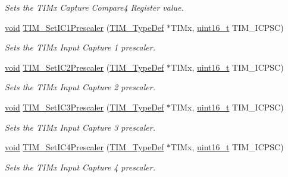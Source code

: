 \begin{DoxyCompactItemize}
\begin{DoxyCompactList}\small\item\em Sets the T\+I\+Mx Capture Compare4 Register value. \end{DoxyCompactList}\item 
\hyperlink{usb__devapi_8h_afabf60e7f57651d6d595a02c75f07cd0}{void} \hyperlink{group___t_i_m___private___functions_gaf0f684dea88e222de9689d8ed0ca8805}{T\+I\+M\+\_\+\+Set\+I\+C1\+Prescaler} (\hyperlink{struct_t_i_m___type_def}{T\+I\+M\+\_\+\+Type\+Def} $\ast$T\+I\+Mx, \hyperlink{_p_e___types_8h_a1f1825b69244eb3ad2c7165ddc99c956}{uint16\+\_\+t} T\+I\+M\+\_\+\+I\+C\+P\+SC)
\begin{DoxyCompactList}\small\item\em Sets the T\+I\+Mx Input Capture 1 prescaler. \end{DoxyCompactList}\item 
\hyperlink{usb__devapi_8h_afabf60e7f57651d6d595a02c75f07cd0}{void} \hyperlink{group___t_i_m___private___functions_ga3cc4869b5fe73271808512c89322a325}{T\+I\+M\+\_\+\+Set\+I\+C2\+Prescaler} (\hyperlink{struct_t_i_m___type_def}{T\+I\+M\+\_\+\+Type\+Def} $\ast$T\+I\+Mx, \hyperlink{_p_e___types_8h_a1f1825b69244eb3ad2c7165ddc99c956}{uint16\+\_\+t} T\+I\+M\+\_\+\+I\+C\+P\+SC)
\begin{DoxyCompactList}\small\item\em Sets the T\+I\+Mx Input Capture 2 prescaler. \end{DoxyCompactList}\item 
\hyperlink{usb__devapi_8h_afabf60e7f57651d6d595a02c75f07cd0}{void} \hyperlink{group___t_i_m___private___functions_ga76f906383b8132ebe00dffadb70cf7f9}{T\+I\+M\+\_\+\+Set\+I\+C3\+Prescaler} (\hyperlink{struct_t_i_m___type_def}{T\+I\+M\+\_\+\+Type\+Def} $\ast$T\+I\+Mx, \hyperlink{_p_e___types_8h_a1f1825b69244eb3ad2c7165ddc99c956}{uint16\+\_\+t} T\+I\+M\+\_\+\+I\+C\+P\+SC)
\begin{DoxyCompactList}\small\item\em Sets the T\+I\+Mx Input Capture 3 prescaler. \end{DoxyCompactList}\item 
\hyperlink{usb__devapi_8h_afabf60e7f57651d6d595a02c75f07cd0}{void} \hyperlink{group___t_i_m___private___functions_ga0f2c784271356d6b64b8c0da64dbdbc2}{T\+I\+M\+\_\+\+Set\+I\+C4\+Prescaler} (\hyperlink{struct_t_i_m___type_def}{T\+I\+M\+\_\+\+Type\+Def} $\ast$T\+I\+Mx, \hyperlink{_p_e___types_8h_a1f1825b69244eb3ad2c7165ddc99c956}{uint16\+\_\+t} T\+I\+M\+\_\+\+I\+C\+P\+SC)
\begin{DoxyCompactList}\small\item\em Sets the T\+I\+Mx Input Capture 4 prescaler. \end{DoxyCompactList}\item 

\end{DoxyCompactItemize}
